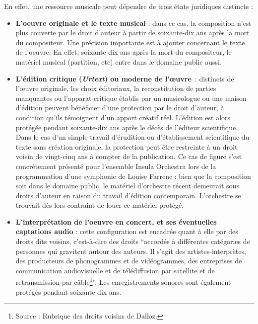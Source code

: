 En effet, une ressource musicale peut dépendre de trois états juridiques distincts : 

\begin{itemize}
	
	\item\textbf{L'oeuvre originale et le texte musical} : dans ce cas, la composition n'est plus couverte par le droit d'auteur à partir de soixante-dix ans après la mort du compositeur. Une précision importante est à ajouter concernant le texte de l'oeuvre. En effet, soixante-dix ans après la mort du compositeur, le matériel musical (partition, etc) entre dans le domaine public aussi. 

	\item \textbf{L'édition critique (\textit{Urtext}) ou moderne de l'œuvre}~: distincts de l'œuvre originale, les choix éditoriaux, la reconstitution de parties manquantes ou l'apparat critique établis par un musicologue ou une maison d'édition peuvent bénéficier d'une protection par le droit d'auteur, à condition qu'ils témoignent d'un apport créatif réel. L'édition est alors protégée pendant soixante-dix ans après le décès de l'éditeur scientifique. Dans le cas d'un simple travail d'érudition ou d'établissement scientifique du texte sans création originale, la protection peut être restreinte à un droit voisin de vingt-cinq ans à compter de la publication. Ce cas de figure s'est concrètement présenté pour l'ensemble Insula Orchestra lors de la programmation d'une symphonie de Louise Farrenc : bien que la composition soit dans le domaine public, le matériel d'orchestre récent demeurait sous droits d'auteur en raison du travail d'édition contemporain. L'orchestre se trouvait dès lors contraint de louer ce matériel protégé.
	
	\item \textbf{L'interprétation de l'oeuvre en concert, et ses éventuelles captations audio} : cette configuration est encadrée quant à elle par des droits dits voisins, c'est-à-dire des droits \enquote{accordés à différentes catégories de personnes qui gravitent autour des auteurs. Il s'agit des artistes-interprètes, des producteurs de phonogrammes et de vidéogrammes, des entreprises de communication audiovisuelle et de télédiffusion par satellite et de retransmission par câble\footnote{Source : Rubrique des droits voisins de Dalloz.}}. Les enregistrements sonores sont également protégés pendant soixante-dix ans.
\end{itemize}

